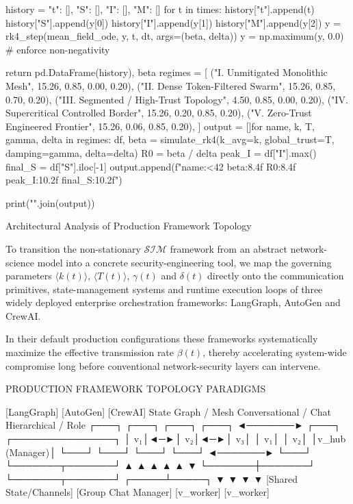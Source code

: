    history = {"t": [], "S": [], "I": [], "M": []}
    for t in times:
        history["t"].append(t)
        history["S"].append(y[0])
        history["I"].append(y[1])
        history["M"].append(y[2])
        y = rk4_step(mean_field_ode, y, t, dt, args=(beta, delta))
        y = np.maximum(y, 0.0)  # enforce non-negativity
    
    return pd.DataFrame(history), beta
regimes = [
    ("I.   Unmitigated Monolithic Mesh",       15.26, 0.85, 0.00, 0.20),
    ("II.  Dense Token-Filtered Swarm",        15.26, 0.85, 0.70, 0.20),
    ("III. Segmented / High-Trust Topology",    4.50, 0.85, 0.00, 0.20),
    ("IV.  Supercritical Controlled Border",   15.26, 0.20, 0.85, 0.20),
    ("V.   Zero-Trust Engineered Frontier",    15.26, 0.06, 0.85, 0.20),
]
output = []for name, k, T, gamma, delta in regimes:
    df, beta = simulate_rk4(k_avg=k, global_trust=T, damping=gamma, delta=delta)
    R0 = beta / delta
    peak_I = df["I"].max()
    final_S = df["S"].iloc[-1]
    output.append(f"{name:<42} {beta:8.4f} {R0:8.4f} {peak_I:10.2f} {final_S:10.2f}")

print("\n".join(output))

Architectural Analysis of Production Framework Topology

To transition the non-stationary \(\mathcal{S}\mathcal{I}\mathcal{M}\) framework from an abstract network-science model into a concrete security-engineering tool, we map the governing parameters \(\langle k(t)\rangle\), \(\langle T(t)\rangle\), \(\gamma(t)\) and \(\delta(t)\) directly onto the communication primitives, state-management systems and runtime execution loops of three widely deployed enterprise orchestration frameworks: LangGraph, AutoGen and CrewAI.

In their default production configurations these frameworks systematically maximize the effective transmission rate \(\beta(t)\), thereby accelerating system-wide compromise long before conventional network-security layers can intervene.

                      PRODUCTION FRAMEWORK TOPOLOGY PARADIGMS
                      
       [LangGraph]                   [AutoGen]                   [CrewAI]
  State Graph / Mesh            Conversational / Chat        Hierarchical / Role
 ┌───┐   ┌───┐   ┌───┐         ┌───┐ ◄───────► ┌───┐         ┌───────────────┐
 │ v₁│◄─►│ v₂│◄─►│ v₃│         │ v₁│           │ v₂│         │v_hub (Manager)│
 └───┘   └───┘   └───┘         └───┘ ◄───────► └───┘         └───────┬───────┘
   ▲       ▲       ▲             ▲               ▲                   ▼
   └───────┼───────┘             └───────┬───────┘             ┌─────┴─────┐
           ▼                             ▼                     ▼           ▼
   [Shared State/Channels]     [Group Chat Manager]        [v_worker]  [v_worker]


